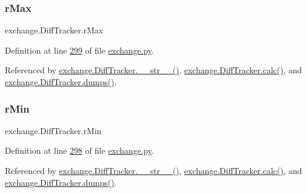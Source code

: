 \mbox{\label{classexchange_1_1_diff_tracker_ab4266c6d4fc968997e26044a7c827980}} 
\subsubsection{\texorpdfstring{r\+Max}{rMax}}
{\footnotesize\ttfamily exchange.\+Diff\+Tracker.\+r\+Max}



Definition at line \hyperlink{exchange_8py_source_l00299}{299} of file \hyperlink{exchange_8py_source}{exchange.\+py}.



Referenced by \hyperlink{exchange_8py_source_l00336}{exchange.\+Diff\+Tracker.\+\_\+\+\_\+str\+\_\+\+\_\+()}, \hyperlink{exchange_8py_source_l00309}{exchange.\+Diff\+Tracker.\+calc()}, and \hyperlink{exchange_8py_source_l00385}{exchange.\+Diff\+Tracker.\+dumps()}.

\mbox{\label{classexchange_1_1_diff_tracker_ad3250cb94933244444942dec9199d362}} 
\subsubsection{\texorpdfstring{r\+Min}{rMin}}
{\footnotesize\ttfamily exchange.\+Diff\+Tracker.\+r\+Min}



Definition at line \hyperlink{exchange_8py_source_l00298}{298} of file \hyperlink{exchange_8py_source}{exchange.\+py}.



Referenced by \hyperlink{exchange_8py_source_l00336}{exchange.\+Diff\+Tracker.\+\_\+\+\_\+str\+\_\+\+\_\+()}, \hyperlink{exchange_8py_source_l00309}{exchange.\+Diff\+Tracker.\+calc()}, and \hyperlink{exchange_8py_source_l00385}{exchange.\+Diff\+Tracker.\+dumps()}.

\mbox{\label{classexchange_1_1_diff_tracker_aa9d0293d5485e1f711db62e59ab11a8a}} 
